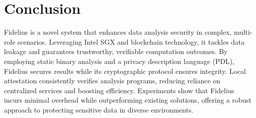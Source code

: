 \section{Conclusion}\label{sec:conclude}
Fidelius is a novel system that enhances data analysis security in complex, multi-role scenarios. Leveraging Intel SGX and blockchain technology, it tackles data leakage and guarantees trustworthy, verifiable computation outcomes. By employing static binary analysis and a privacy description language (PDL), Fidelius secures results while its cryptographic protocol ensures integrity. Local attestation consistently verifies analysis programs, reducing reliance on centralized services and boosting efficiency. Experiments show that Fidelius incurs minimal overhead while outperforming existing solutions, offering a robust approach to protecting sensitive data in diverse environments.